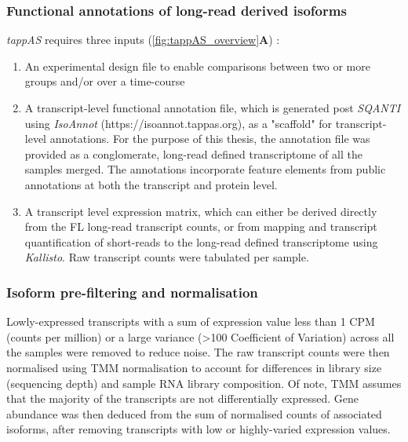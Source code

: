 \clearpage
\subsubsection{Functional annotations of long-read derived isoforms}
\textit{tappAS} requires three inputs (\cref{fig:tappAS_overview}\textbf{A}) :
\begin{enumerate}
	\item An experimental design file to enable comparisons between two or more groups and/or over a time-course 
	\item A transcript-level functional annotation file, which is generated post \textit{SQANTI} using \textit{IsoAnnot} (https://isoannot.tappas.org), as a "scaffold" for transcript-level annotations. For the purpose of this thesis, the annotation file was provided as a conglomerate, long-read defined transcriptome of all the samples merged. The annotations incorporate feature elements from public annotations at both the transcript and protein level. 
	\item A transcript level expression matrix, which can either be derived directly from the FL long-read transcript counts, or from mapping and transcript quantification of short-reads to the long-read defined transcriptome using \textit{Kallisto}\cite{Bray2016}. Raw transcript counts were tabulated per sample.  	 
\end{enumerate}


\subsubsection{Isoform pre-filtering and normalisation}
Lowly-expressed transcripts with a sum of expression value less than 1 CPM (counts per million) or a large variance (>100 Coefficient of Variation) across all the samples were removed to reduce noise. The raw transcript counts were then normalised using TMM normalisation \cite{Robinson2010} to account for differences in library size (sequencing depth) and sample RNA library composition. Of note, TMM assumes that the majority of the transcripts are not differentially expressed. Gene abundance was then deduced from the sum of normalised counts of associated isoforms, after removing transcripts with low or highly-varied expression values. 
 

